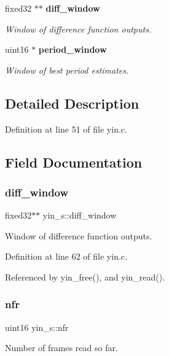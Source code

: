 \begin{DoxyCompactItemize}
fixed32 $\ast$$\ast$ \textbf{ diff\+\_\+window}
\begin{DoxyCompactList}\small\item\em Window of difference function outputs. \end{DoxyCompactList}\item 
uint16 $\ast$ \textbf{ period\+\_\+window}
\begin{DoxyCompactList}\small\item\em Window of best period estimates. \end{DoxyCompactList}\end{DoxyCompactItemize}


\subsection{Detailed Description}


Definition at line 51 of file yin.\+c.



\subsection{Field Documentation}
\mbox{\label{structyin__s_a932e8441ff0aa6b9b37f5055c97a4d11}} 
\subsubsection{diff\+\_\+window}
{\footnotesize\ttfamily fixed32$\ast$$\ast$ yin\+\_\+s\+::diff\+\_\+window}



Window of difference function outputs. 



Definition at line 62 of file yin.\+c.



Referenced by yin\+\_\+free(), and yin\+\_\+read().

\mbox{\label{structyin__s_af4f11d14a36bbdc19863fa8335237423}} 
\subsubsection{nfr}
{\footnotesize\ttfamily uint16 yin\+\_\+s\+::nfr}



Number of frames read so far. 



